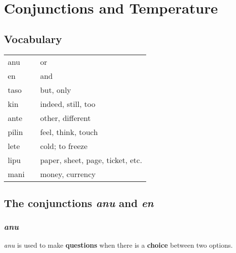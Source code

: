 \section{Conjunctions and Temperature}
%
\subsection*{Vocabulary}
%
\begin{supertabular}{p{5,5cm}|ll}
anu && or \\
en && and \\
taso && but, only \\
kin && indeed, still, too \\    
ante && other, different \\
pilin && feel, think, touch \\
lete && cold; to freeze \\
lipu && paper, sheet, page, ticket, etc. \\
mani && money, currency \\
\end{supertabular} 
% 
\subsection*{The conjunctions \textit{anu} and \textit{en}}
%
\subsubsection*{\textit{anu}}
%
\textit{anu} is used to make \textbf{questions} when there is a \textbf{choice} between two options. 

